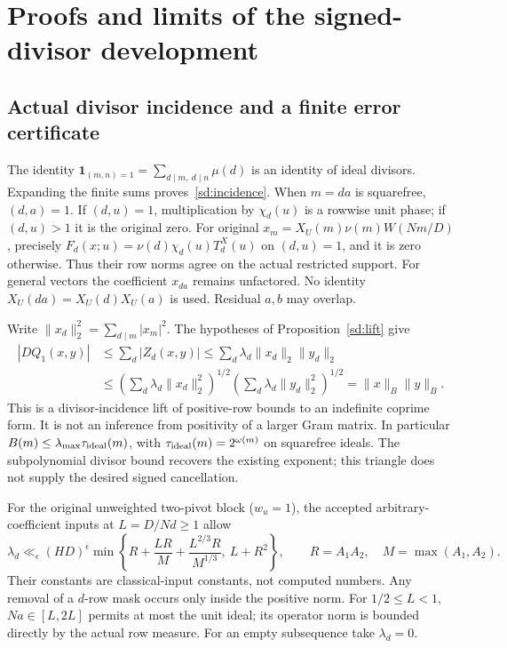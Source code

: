 \section{Proofs and limits of the signed-divisor development}\label{sd:details}
\subsection{Actual divisor incidence and a finite error certificate}
The identity
$\mathbf1_{(m,n)=1}=\sum_{d\mid m,\ d\mid n}\mu(d)$ is an identity of
ideal divisors. Expanding the finite sums proves~\eqref{sd:incidence}.
When $m=da$ is squarefree, $(d,a)=1$. If $(d,u)=1$, multiplication by
$\chi_d(u)$ is a rowwise unit phase; if $(d,u)>1$ it is the original zero.
For original $x_m=X_U(m)\nu(m)W(Nm/D)$, precisely
$F_d(x;u)=\nu(d)\chi_d(u)T_d^X(u)$ on $(d,u)=1$, and it is zero
otherwise. Thus their row norms agree on the actual restricted support.
For general vectors the coefficient $x_{da}$ remains unfactored.
No identity $X_U(da)=X_U(d)X_U(a)$ is used. Residual $a,b$ may overlap.

Write $\|x_d\|_2^2=\sum_{d\mid m}|x_m|^2$.
The hypotheses of Proposition~\ref{sd:lift} give
\[
 \begin{split}
 |DQ_1(x,y)|&\le\sum_d |Z_d(x,y)|
 \le\sum_d\lambda_d\|x_d\|_2\|y_d\|_2\\
 &\le\left(\sum_d\lambda_d\|x_d\|_2^2\right)^{1/2}
       \left(\sum_d\lambda_d\|y_d\|_2^2\right)^{1/2}
 =\|x\|_B\|y\|_B.
 \end{split}
\]
This is a divisor-incidence lift of positive-row bounds to an indefinite
coprime form. It is not an inference from positivity of a larger Gram
matrix. In particular $B(m)\le\lambda_{\max}\tau_{\rm ideal}(m)$,
with $\tau_{\rm ideal}(m)=2^{\omega(m)}$ on squarefree ideals.
The subpolynomial divisor bound recovers the existing exponent; this
triangle does not supply the desired signed cancellation.

For the original unweighted two-pivot block ($w_u=1$), the accepted
arbitrary-coefficient inputs
at $L=D/Nd\ge1$ allow
\[
 \lambda_d\ll_\epsilon(HD)^\epsilon
 \min\left\{R+\frac{LR}{M}+\frac{L^{2/3}R}{M^{1/3}},\ L+R^2\right\},
 \qquad R=A_1A_2,\quad M=\max(A_1,A_2).
\]
Their constants are classical-input constants, not computed numbers.
Any removal of a $d$-row mask occurs only inside the positive norm.
For $1/2\le L<1$, $Na\in[L,2L]$ permits at most the unit ideal; its
operator norm is bounded directly by the actual row measure.
For an empty subsequence take $\lambda_d=0$.

